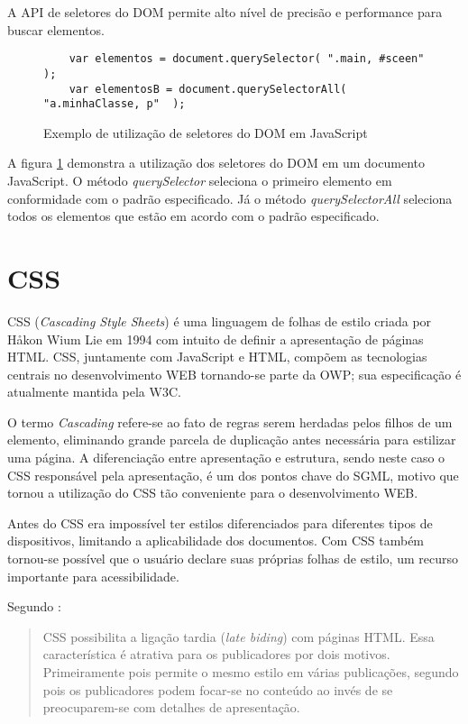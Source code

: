 A API de seletores do DOM permite alto nível de precisão e performance para buscar elementos.

\begin{figure}
\centering
\begin{verbatim}
    var elementos = document.querySelector( ".main, #sceen"  );
    var elementosB = document.querySelectorAll( "a.minhaClasse, p"  );
\end{verbatim}
\caption{Exemplo de utilização de seletores do DOM em JavaScript}
\label{fig:selectorsSample}
\end{figure}

A figura \ref{fig:selectorsSample} demonstra a utilização dos seletores do DOM em um documento
JavaScript. O método \textit{querySelector} seleciona o primeiro elemento em conformidade
com o padrão especificado. Já o método \textit{querySelectorAll} seleciona todos os elementos
que estão em acordo com o padrão especificado.

\section{CSS}
CSS (\textit{Cascading Style Sheets}) é uma linguagem de folhas de
estilo criada por Håkon Wium Lie em 1994 com intuito de definir a
apresentação de páginas HTML. CSS, juntamente com JavaScript e HTML,
compõem as tecnologias centrais no desenvolvimento WEB tornando-se
parte da OWP; sua especificação é atualmente mantida pela W3C.

O termo \textit{Cascading} refere-se ao fato de regras serem herdadas
pelos filhos de um elemento, eliminando grande parcela de duplicação
antes necessária para estilizar uma página. A diferenciação entre
apresentação e estrutura, sendo neste caso o CSS responsável pela
apresentação, é um dos pontos chave do SGML, motivo que tornou a
utilização do CSS tão conveniente para o desenvolvimento WEB.

Antes do CSS era impossível ter estilos diferenciados para diferentes
tipos de dispositivos, limitando a aplicabilidade dos documentos.
Com CSS também tornou-se possível que o usuário declare suas próprias
folhas de estilo, um recurso importante para acessibilidade.

Segundo \cite[pp. 23--24]{CascadingStyleSheets}:

\begin{quote}
CSS possibilita a ligação tardia (\textit{late biding}) com
páginas HTML. Essa característica é atrativa para os publicadores
por dois motivos. Primeiramente pois permite o mesmo estilo em várias
publicações, segundo pois os publicadores podem focar-se no conteúdo
ao invés de se preocuparem-se com detalhes de apresentação.
\end{quote}


